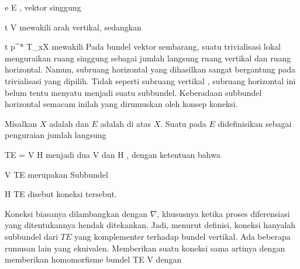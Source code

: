 \mavergleichskette
{\vergleichskette
{ e
}
{ \in }{ E
}
{  }{
}
{    }{
}
{   }{
}
}
{}{}{,}
vektor singgung

\mavergleichskette
{\vergleichskette
{ t
}
{ \in }{ V
}
{  }{
}
{    }{
}
{   }{
}
}
{}{}{}
mewakili arah vertikal, sedangkan

\mavergleichskette
{\vergleichskette
{ t
}
{ \in }{ p^* T_xX
}
{  }{
}
{    }{
}
{   }{
}
}
{}{}{}
mewakili 
Pada bundel vektor sembarang, suatu trivialisasi lokal menguraikan ruang singgung
 sebagai jumlah langsung ruang vertikal dan ruang horizontal. Namun, subruang horizontal yang dihasilkan sangat bergantung pada trivialisasi yang dipilih. Tidak seperti subruang vertikal
 {} {,}
subruang horizontal ini belum tentu menyatu menjadi suatu subbundel. Keberadaan subbundel horizontal semacam inilah yang dirumuskan oleh konsep koneksi.

{}
{

Misalkan $X$ adalah
dan $E$ adalah
di atas $X$. Suatu
pada $E$ didefinisikan sebagai penguraian jumlah langsung

\mavergleichskette
{\vergleichskette
{ TE
}
{ = }{ V \oplus H
}
{  }{
}
{    }{
}
{   }{
}
}
{}{}{}
menjadi dua
\mathkor {} {V} {dan} {H} {,}
dengan ketentuan bahwa

\mavergleichskette
{\vergleichskette
{ V
}
{ \subseteq }{ TE
}
{  }{
}
{    }{
}
{   }{
}
}
{}{}{}
merupakan
Subbundel

\mavergleichskette
{\vergleichskette
{ H
}
{ \subseteq }{ TE
}
{  }{
}
{    }{
}
{   }{
}
}
{}{}{}
disebut
koneksi tersebut.

}

Koneksi biasanya dilambangkan dengan $\nabla$, khususnya ketika proses diferensiasi yang ditentukannya hendak ditekankan. Jadi, menurut definisi, koneksi hanyalah subbundel dari $TE$ yang komplementer terhadap bundel vertikal. Ada beberapa rumusan lain yang ekuivalen. Memberikan suatu koneksi sama artinya dengan memberikan homomorfisme bundel
 {} {}
 {TE} {V
} {}
dengan

